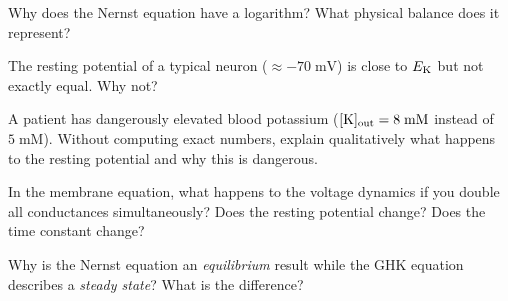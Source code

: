 \begin{conceptquestions}
  \item Why does the Nernst equation have a logarithm? What physical balance does it represent?

  \item The resting potential of a typical neuron ($\approx -70\;\text{mV}$) is close to $E_{\mathrm{K}}$ but not exactly equal. Why not?

  \item A patient has dangerously elevated blood potassium ($[\mathrm{K}]_{\text{out}} = 8\;\text{mM}$ instead of $5\;\text{mM}$). Without computing exact numbers, explain qualitatively what happens to the resting potential and why this is dangerous.

  \item In the membrane equation, what happens to the voltage dynamics if you double all conductances simultaneously? Does the resting potential change? Does the time constant change?

  \item Why is the Nernst equation an \emph{equilibrium} result while the GHK equation describes a \emph{steady state}? What is the difference?
\end{conceptquestions}

